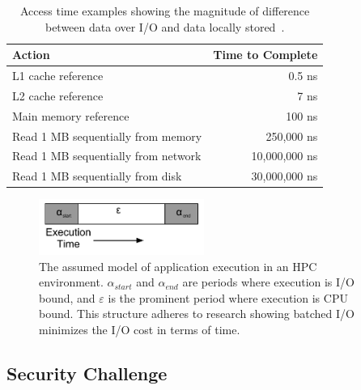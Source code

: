 \documentclass[oneside,12pt]{memoir}
\begin{document}
\begin{table}
	\begin{center}
	    \begin{tabular}{  l | r }
	    Action & Time to Complete \\ \hline
	    L1 cache reference & 0.5 ns  \\ 
	    L2 cache reference & 7 ns  \\
	    Main memory reference & 100 ns \\
	    Read 1 MB sequentially from memory & 250,000 ns  \\  
	    Read 1 MB sequentially from network & 10,000,000 ns \\ 
		Read 1 MB sequentially from disk & 30,000,000 ns \\
	    \end{tabular}
	\end{center}
	\caption{Access time examples showing the magnitude of difference between data over I/O and data locally stored~\cite{dean2009designs}.}
\end{table}

\begin{figure}
  \begin{center}
    \includegraphics[width=0.48\textwidth]{application_model.pdf}
  \end{center}
  \caption{The assumed model of application execution in an HPC environment. $\alpha_{start}$ and $\alpha_{end}$ are periods where execution is I/O bound, and $\varepsilon$ is the prominent period where execution is CPU bound. This structure adheres to research showing batched I/O minimizes the I/O cost in terms of time.}
\label{fig:application_model}
\end{figure}

\subsection{Security Challenge}
\end{document}

